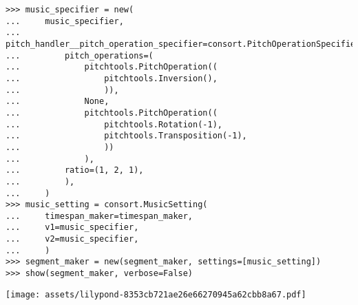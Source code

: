 \begin{comment}
<abjad>[stylesheet=../consort.ily]
music_specifier = new(
    music_specifier,
    pitch_handler__pitch_operation_specifier=consort.PitchOperationSpecifier(
        pitch_operations=(
            pitchtools.PitchOperation((
                pitchtools.Inversion(),
                )),
            None,
            pitchtools.PitchOperation((
                pitchtools.Rotation(-1),
                pitchtools.Transposition(-1),
                ))
            ),
        ratio=(1, 2, 1),
        ),
    )
music_setting = consort.MusicSetting(
    timespan_maker=timespan_maker,
    v1=music_specifier,
    v2=music_specifier,
    )
segment_maker = new(segment_maker, settings=[music_setting])
show(segment_maker, verbose=False)
</abjad>
\end{comment}

\begin{abjadbookoutput}
\begin{singlespacing}
\vspace{-0.5\baselineskip}
\begin{lstlisting}
>>> music_specifier = new(
...     music_specifier,
...     pitch_handler__pitch_operation_specifier=consort.PitchOperationSpecifier(
...         pitch_operations=(
...             pitchtools.PitchOperation((
...                 pitchtools.Inversion(),
...                 )),
...             None,
...             pitchtools.PitchOperation((
...                 pitchtools.Rotation(-1),
...                 pitchtools.Transposition(-1),
...                 ))
...             ),
...         ratio=(1, 2, 1),
...         ),
...     )
>>> music_setting = consort.MusicSetting(
...     timespan_maker=timespan_maker,
...     v1=music_specifier,
...     v2=music_specifier,
...     )
>>> segment_maker = new(segment_maker, settings=[music_setting])
>>> show(segment_maker, verbose=False)
\end{lstlisting}
\noindent\texttt{[image: assets/lilypond-8353cb721ae26e66270945a62cbb8a67.pdf]}
\end{singlespacing}
\end{abjadbookoutput}

\begin{comment}
<abjad>[stylesheet=../consort.ily]
music_specifier = new(
    music_specifier,
    pitch_handler__forbid_repetitions=True,
    )
music_setting = consort.MusicSetting(
    timespan_maker=timespan_maker,
    v1=music_specifier,
    v2=music_specifier,
    )
segment_maker = new(segment_maker, settings=[music_setting])
show(segment_maker, verbose=False)
</abjad>
\end{comment}

